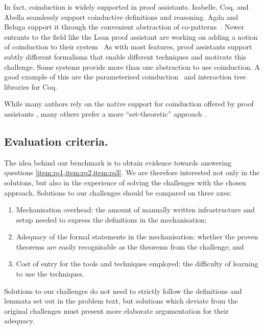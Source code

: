 \documentclass[runningheads]{llncs}
\begin{document}
In fact, coinduction is widely supported in proof assistants.
Isabelle, Coq, and Abella seamlessly support coinductive definitions and reasoning.
Agda and Beluga support it through the convenient abstraction of co-patterns~\cite{Abel2013}.
Newer entrants to the field like the Lean proof assistant
are working on adding a notion of coinduction to their system~\cite{Avigad2019}%
%
As with most features, proof assistants support
subtly different formalisms that enable different techniques and motivate this challenge.
Some systems provide more than one abstraction to use coinduction.
A good example of this are the parameterised coinduction~\cite{Hur2013}
and interaction tree~\cite{Xia2019} libraries for Coq.


While many authors rely on the native support for coinduction offered
by proof assistants
\cite{Honsell2001,Bengtson2016,Kahsai2008,Thiemann2019,Gay2020}, many
others prefer a more ``set-theoretic'' approach
\cite{Hirschkoff1997,Bengtson2009,Maksimovic2015,Pohjola2022}.

\subsection{Evaluation criteria.}
The idea behind our benchmark is to obtain evidence towards answering
questions \cref{item:rq1,item:rq2,item:rq3}. We are therefore
interested not only in the solutions, but also in the experience of
solving the challenges with the chosen approach.  Solutions to our
challenges should be compared on three axes:
\begin{enumerate}
\item Mechanisation overhead: the amount of manually written infrastructure and setup needed to express the definitions in the mechanisation;
\item Adequacy of the formal statements in the mechanisation: whether the proven theorems are easily recognisable as the theorems from the challenge; and
\item Cost of entry for the tools and techniques employed: the difficulty of learning to use the techniques.
\end{enumerate}
Solutions to our challenges do not need to strictly follow the definitions and lemmata set out in the problem text, but solutions which deviate from the original challenges must present more elaborate argumentation for their adequacy.
\end{document}
